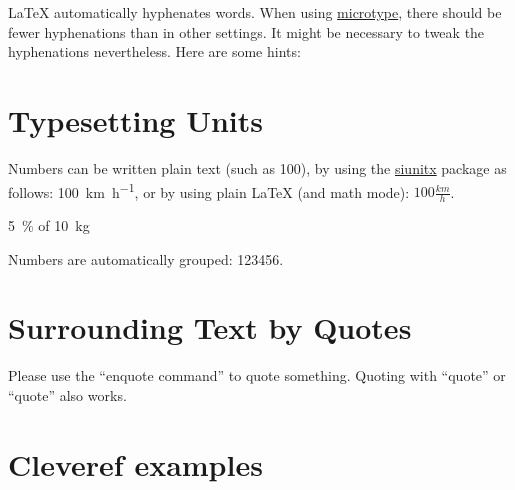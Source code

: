 \LaTeX{} automatically hyphenates words.
When using \href{https://ctan.org/pkg/microtype}{microtype}, there should be fewer hyphenations than in other settings.
It might be necessary to tweak the hyphenations nevertheless.
Here are some hints:


\section{Typesetting Units}

\begin{ltgexample}
Numbers can be written plain text (such as 100), by using the \href{https://ctan.org/pkg/siunitx}{siunitx} package as follows:
\SI{100}{\km\per\hour},
or by using plain \LaTeX{} (and math mode):
$100 \frac{\mathit{km}}{h}$.
\end{ltgexample}

\begin{ltgexample}
\SI{5}{\percent} of \SI{10}{kg}
\end{ltgexample}

\begin{ltgexample}
Numbers are automatically grouped: \num{123456}.
\end{ltgexample}

\section{Surrounding Text by Quotes}

\begin{ltgexample}
Please use the \enquote{enquote command} to quote something.
Quoting with "`quote"' or ``quote'' also works.

\end{ltgexample}

\section{Cleveref examples}
\label{sec:ex:cref}

